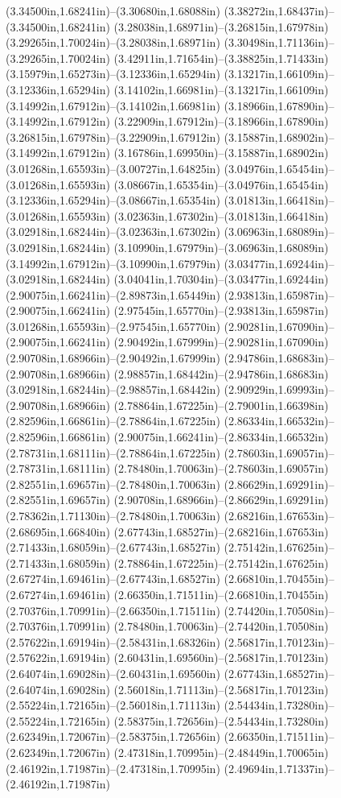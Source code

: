 (3.34500in,1.68241in)--(3.30680in,1.68088in) (3.38272in,1.68437in)--(3.34500in,1.68241in) (3.28038in,1.68971in)--(3.26815in,1.67978in) (3.29265in,1.70024in)--(3.28038in,1.68971in) (3.30498in,1.71136in)--(3.29265in,1.70024in) (3.42911in,1.71654in)--(3.38825in,1.71433in) (3.15979in,1.65273in)--(3.12336in,1.65294in) (3.13217in,1.66109in)--(3.12336in,1.65294in) (3.14102in,1.66981in)--(3.13217in,1.66109in) (3.14992in,1.67912in)--(3.14102in,1.66981in) (3.18966in,1.67890in)--(3.14992in,1.67912in) (3.22909in,1.67912in)--(3.18966in,1.67890in) (3.26815in,1.67978in)--(3.22909in,1.67912in) (3.15887in,1.68902in)--(3.14992in,1.67912in) (3.16786in,1.69950in)--(3.15887in,1.68902in) (3.01268in,1.65593in)--(3.00727in,1.64825in) (3.04976in,1.65454in)--(3.01268in,1.65593in) (3.08667in,1.65354in)--(3.04976in,1.65454in) (3.12336in,1.65294in)--(3.08667in,1.65354in) (3.01813in,1.66418in)--(3.01268in,1.65593in) (3.02363in,1.67302in)--(3.01813in,1.66418in) (3.02918in,1.68244in)--(3.02363in,1.67302in) (3.06963in,1.68089in)--(3.02918in,1.68244in) (3.10990in,1.67979in)--(3.06963in,1.68089in) (3.14992in,1.67912in)--(3.10990in,1.67979in) (3.03477in,1.69244in)--(3.02918in,1.68244in) (3.04041in,1.70304in)--(3.03477in,1.69244in) (2.90075in,1.66241in)--(2.89873in,1.65449in) (2.93813in,1.65987in)--(2.90075in,1.66241in) (2.97545in,1.65770in)--(2.93813in,1.65987in) (3.01268in,1.65593in)--(2.97545in,1.65770in) (2.90281in,1.67090in)--(2.90075in,1.66241in) (2.90492in,1.67999in)--(2.90281in,1.67090in) (2.90708in,1.68966in)--(2.90492in,1.67999in) (2.94786in,1.68683in)--(2.90708in,1.68966in) (2.98857in,1.68442in)--(2.94786in,1.68683in) (3.02918in,1.68244in)--(2.98857in,1.68442in) (2.90929in,1.69993in)--(2.90708in,1.68966in) (2.78864in,1.67225in)--(2.79001in,1.66398in) (2.82596in,1.66861in)--(2.78864in,1.67225in) (2.86334in,1.66532in)--(2.82596in,1.66861in) (2.90075in,1.66241in)--(2.86334in,1.66532in) (2.78731in,1.68111in)--(2.78864in,1.67225in) (2.78603in,1.69057in)--(2.78731in,1.68111in) (2.78480in,1.70063in)--(2.78603in,1.69057in) (2.82551in,1.69657in)--(2.78480in,1.70063in) (2.86629in,1.69291in)--(2.82551in,1.69657in) (2.90708in,1.68966in)--(2.86629in,1.69291in) (2.78362in,1.71130in)--(2.78480in,1.70063in) (2.68216in,1.67653in)--(2.68695in,1.66840in) (2.67743in,1.68527in)--(2.68216in,1.67653in) (2.71433in,1.68059in)--(2.67743in,1.68527in) (2.75142in,1.67625in)--(2.71433in,1.68059in) (2.78864in,1.67225in)--(2.75142in,1.67625in) (2.67274in,1.69461in)--(2.67743in,1.68527in) (2.66810in,1.70455in)--(2.67274in,1.69461in) (2.66350in,1.71511in)--(2.66810in,1.70455in) (2.70376in,1.70991in)--(2.66350in,1.71511in) (2.74420in,1.70508in)--(2.70376in,1.70991in) (2.78480in,1.70063in)--(2.74420in,1.70508in) (2.57622in,1.69194in)--(2.58431in,1.68326in) (2.56817in,1.70123in)--(2.57622in,1.69194in) (2.60431in,1.69560in)--(2.56817in,1.70123in) (2.64074in,1.69028in)--(2.60431in,1.69560in) (2.67743in,1.68527in)--(2.64074in,1.69028in) (2.56018in,1.71113in)--(2.56817in,1.70123in) (2.55224in,1.72165in)--(2.56018in,1.71113in) (2.54434in,1.73280in)--(2.55224in,1.72165in) (2.58375in,1.72656in)--(2.54434in,1.73280in) (2.62349in,1.72067in)--(2.58375in,1.72656in) (2.66350in,1.71511in)--(2.62349in,1.72067in) (2.47318in,1.70995in)--(2.48449in,1.70065in) (2.46192in,1.71987in)--(2.47318in,1.70995in) (2.49694in,1.71337in)--(2.46192in,1.71987in) 